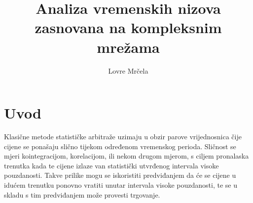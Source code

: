 \documentclass[lmodern, utf8, diplomski, numeric]{fer}
\begin{document}

\title{Analiza vremenskih nizova zasnovana na kompleksnim mrežama}

\author{Lovre Mrčela}

\maketitle



\tableofcontents

\chapter{Uvod}
  Klasične metode statističke arbitraže uzimaju u obzir parove vrijednosnica čije cijene se ponašaju slično tijekom određenom vremenskog perioda.
  Sličnost se mjeri kointegracijom, korelacijom, ili nekom drugom mjerom, s ciljem pronalaska trenutka kada te cijene izlaze van statistički utvrđenog intervala visoke pouzdanosti.
  Takve prilike mogu se iskoristiti predviđanjem da će se cijene u idućem trenutku ponovno vratiti unutar intervala visoke pouzdanosti, te se u skladu s tim predviđanjem može provesti trgovanje.
  
\end{document}
